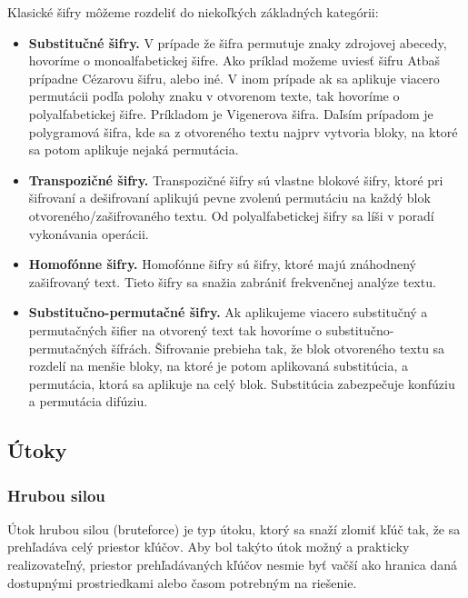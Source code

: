 Klasické šifry môžeme rozdeliť do niekoľkých základných kategórii:
\begin{itemize}

\item \textbf{Substitučné šifry.}
  V prípade že šifra permutuje znaky zdrojovej abecedy, hovoríme o monoalfabetickej šifre.
  Ako príklad možeme uviesť šifru Atbaš prípadne Cézarovu šifru, alebo iné.
  V inom prípade ak sa aplikuje viacero permutácii podľa polohy znaku v otvorenom texte, tak hovoríme o polyalfabetickej šifre.
  Príkladom je Vigenerova šifra. Daľsím prípadom je polygramová šifra, kde sa z otvoreného textu najprv vytvoria bloky,
  na ktoré sa potom aplikuje nejaká permutácia.

\item \textbf{Transpozičné šifry.}
  Transpozičné šifry sú vlastne blokové šifry, ktoré pri šifrovaní a dešifrovaní aplikujú pevne zvolenú permutáciu na každý blok
  otvoreného/zašifrovaného textu. Od polyalfabetickej šifry sa líši v poradí vykonávania operácii.
  
\item \textbf{Homofónne šifry.}
  Homofónne šifry sú šifry, ktoré majú znáhodnený zašifrovaný text. Tieto šifry sa snažia zabrániť frekvenčnej analýze textu. 
  
\item \textbf{Substitučno-permutačné šifry.}
  Ak aplikujeme viacero substitučný a permutačných šifier na otvorený text tak hovoríme o substitučno-permutačných šífrách.
  Šifrovanie prebieha tak, že blok otvoreného textu sa rozdelí na menšie bloky, na ktoré je potom aplikovaná substitúcia, a permutácia,
  ktorá sa aplikuje na celý blok. Substitúcia zabezpečuje konfúziu a permutácia difúziu.
  
\end{itemize}

\subsection{Útoky}
\subsubsection{Hrubou silou}
Útok hrubou silou (bruteforce) je typ útoku, ktorý sa snaží zlomiť kľúč tak, že sa prehľadáva celý priestor kľúčov.
Aby bol takýto útok možný a prakticky realizovateľný, priestor prehľadávaných kľúčov nesmie byť vačší ako hranica daná dostupnými
prostriedkami alebo časom potrebným na riešenie.

